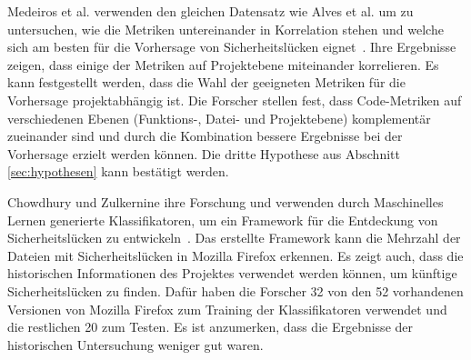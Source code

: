 Medeiros et al. verwenden den gleichen Datensatz wie Alves et al. um zu untersuchen, wie die Metriken untereinander in Korrelation stehen und welche sich am besten für die Vorhersage von Sicherheitslücken eignet~\cite{medeiros_et_al}.
Ihre Ergebnisse zeigen, dass einige der Metriken auf Projektebene miteinander korrelieren.
Es kann festgestellt werden, dass die Wahl der geeigneten Metriken für die Vorhersage projektabhängig ist.
Die Forscher stellen fest, dass Code-Metriken auf verschiedenen Ebenen (Funktions-, Datei- und Projektebene) komplementär zueinander sind und durch die Kombination bessere Ergebnisse bei der Vorhersage erzielt werden können.
Die dritte Hypothese aus Abschnitt \ref{sec:hypothesen} kann bestätigt werden.

Chowdhury und Zulkernine ihre Forschung und verwenden durch Maschinelles Lernen generierte Klassifikatoren, um ein Framework für die Entdeckung von Sicherheitslücken zu entwickeln~\cite{chowdhury_zulkernine_2009,chowdhury_zulkernine_2010}.
Das erstellte Framework kann die Mehrzahl der Dateien mit Sicherheitslücken in Mozilla Firefox erkennen.
Es zeigt auch, dass die historischen Informationen des Projektes verwendet werden können, um künftige Sicherheitslücken zu finden.
Dafür haben die Forscher 32 von den 52 vorhandenen Versionen von Mozilla Firefox zum Training der Klassifikatoren verwendet und die restlichen 20 zum Testen.
Es ist anzumerken, dass die Ergebnisse der historischen Untersuchung weniger gut waren.
